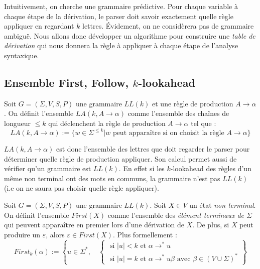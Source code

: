 Intuitivement, on cherche une grammaire prédictive. Pour chaque variable à chaque étape de la dérivation, 
le parser doit savoir exactement quelle règle appliquer en regardant $k$ lettres. Évidement, on ne considèrera 
pas de grammaire ambiguë. Nous allons donc développer un algorithme pour construire une \emph{table de dérivation} 
qui nous donnera la règle à appliquer à chaque étape de l'analyse syntaxique. 

\subsection{Ensemble First, Follow, $k$-lookahead}

\begin{definition}[$k$ - Lookadhead]
    Soit $G = ( \Sigma, V, S, P)$ une grammaire $LL(k)$ et une règle de production $A \rightarrow \alpha$. On définit 
    l'ensemble $LA(k, A \rightarrow \alpha)$ comme l'ensemble des chaînes de longueur $ \leqslant k$ qui déclenchent 
    la règle de production $A \rightarrow \alpha$ tel que : 
        \[ \boxed{LA(k, A \rightarrow \alpha) := \{w \in \Sigma^{ \leqslant k} | w \text{ peut apparaître si on choisit la règle } A \rightarrow \alpha\}} \] 
\end{definition}

$LA(k, A \rightarrow \alpha)$ est donc l'ensemble des lettres que doit regarder le parser pour déterminer 
quelle règle de production appliquer. 
Son calcul permet aussi de vérifier qu'un grammaire est $LL(k)$. En effet si les $k$-lookahead des règles 
d'un même non terminal ont des mots en communs, la grammaire n'est pas $LL(k)$ (i.e on ne saura pas choisir 
quelle règle appliquer). 

\begin{definition}
    Soit $G = ( \Sigma, V, S, P)$ une grammaire $LL(k)$. 
    Soit $X \in V$ un état \emph{non terminal}. On définit l'ensemble $First(X)$ comme l'ensemble 
    des \emph{élément terminaux de $ \Sigma$} qui peuvent apparaître en premier lors d'une dérivation de $X$. 
    De plus, si $X$ peut produire un $ \varepsilon$, alors $ \varepsilon \in  First(X)$. Plus formellement : 
        \[ First_k( \alpha) := 
            \left\{
                u \in \Sigma^*, \quad 
                \begin{cases}
                    \text{ si } |u| < k \text{ et } \alpha \to^* u \\ 
                    \text{ si } |u| = k \text{ et } \alpha \to^* u \beta \text{ avec } \beta \in (V \cup \Sigma)^*      
                \end{cases}
            \right\}
        \] 
\end{definition}

